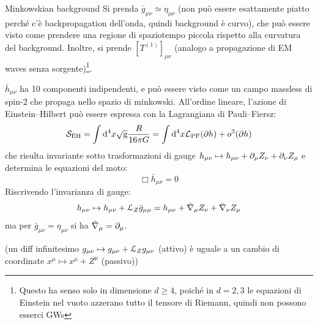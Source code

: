 \begin{example}{Minkowskian background}{}
  Si prenda $ \bar{g}_{\mu \nu} \simeq \eta_{\mu \nu} $ (non può essere esattamente piatto perché c'è backpropagation dell'onda, quindi background è curvo), che può essere visto come prendere una regione di spaziotempo piccola rispetto alla curvatura del background. Inoltre, si prende $ [T^{(1)}]_{\mu \nu} $ (analogo a propagazione di EM waves senza sorgente)\footnote{Questo ha senso solo in dimensione $ d \geq 4 $, poiché in $ d = 2,3 $ le equazioni di Einstein nel vuoto azzerano tutto il tensore di Riemann, quindi non possono esserci GWs}.

  $ \bar{h}_{\mu \nu} $ ha 10 componenti indipendenti, e può essere visto come un campo massless di spin-$ 2 $ che propaga nello spazio di minkowski. All'ordine lineare, l'azione di Einstein--Hilbert può essere espressa con la Lagrangiana di Pauli--Fiersz:
  \begin{equation}
    \mathcal{S}_\text{EH} = \int \mathrm{d}^4x \sqrt{\mathrm{g}} \frac{R}{16\pi G} = \int \mathrm{d}^4x \mathcal{L}_\text{PF}(\partial h) + o^3(\partial h)
  \end{equation}
  che risulta invariante sotto trasformazioni di gauge $ h_{\mu \nu} \mapsto h_{\mu \nu} + \partial_\mu Z_\nu + \partial_\nu Z_\mu $ e determina le equazioni del moto:
  \begin{equation}
    \Box \bar{h}_{\mu \nu} = 0
  \end{equation}
  Riscrivendo l'invarianza di gauge:
  \begin{equation*}
    h_{\mu \nu} \mapsto h_{\mu \nu} + \EuScript{L}_Z \bar{g}_{\mu \mu} = h_{\mu \nu} + \bar{\nabla}_\mu Z_\nu + \bar{\nabla}_\nu Z_\mu
  \end{equation*}
  ma per $ \bar{g}_{\mu \nu} = \eta_{\mu \nu} $ si ha $ \bar{\nabla}_\mu = \partial_\mu $.
  
  (un diff infinitesimo $ g_{\mu \nu} \mapsto g_{\mu \nu} + \EuScript{L}_Z g_{\mu \nu} $ (attivo) è uguale a un cambio di coordinate $ x^\mu \mapsto x^\mu + Z^\mu $ (passivo))


\end{example}
